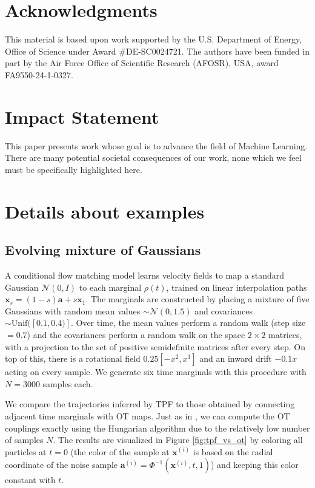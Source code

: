 \documentclass{article}
\newcommand{\bfx}{\boldsymbol{x}}
\newcommand{\bfa}{\boldsymbol{a}}
\theoremstyle{definition}
\theoremstyle{plain}
\theoremstyle{definition}
\theoremstyle{remark}
\newcommand{\Flow}{\Phi}
\begin{document}

\section*{Acknowledgments}
This material is based upon work supported by the U.S. Department of Energy, Office of Science under Award \#DE-SC0024721. The authors have been funded in part by the Air Force Office of Scientific Research (AFOSR), USA, award FA9550-24-1-0327.

\section*{Impact Statement}
This paper presents work whose goal is to advance the field of Machine Learning. There are many potential societal consequences of our work, none which we feel must be specifically highlighted here. 





\newpage
\appendix
\onecolumn
\section{Details about examples}






\subsection{Evolving mixture of Gaussians}\label{appendix:EvolvingGaussians}

A conditional flow matching model learns velocity fields to map a standard Gaussian $\mathcal{N}(0,I)$ to each marginal $\rho(t)$, trained on linear interpolation paths $\bfx_s = (1-s)\bfa + s\bfx_1$. The marginals are constructed by placing a mixture of five Gaussians with random mean values $\sim \mathcal{N}(0, 1.5)$ and covariances $\sim \mathrm{Unif}([0.1, 0.4)]$. Over time, the mean values perform a random walk (step size $= 0.7$) and the covariances perform a random walk on the space $2 \times 2$ matrices, with a projection to the set of positive semidefinite matrices after every step. On top of this, there is a rotational field $0.25 [-x^2, x^1]$ and an inward drift $-0.1 x$ acting on every sample. We generate six time marginals with this procedure with $N = 3000$ samples each.

We compare the trajectories inferred by TPF to those obtained by connecting adjacent time marginals with OT maps. Just as in \cite{terpin_2024_learning}, we can compute the OT couplings exactly using the Hungarian algorithm due to the relatively low number of samples $N$. The results are visualized in Figure \ref{fig:tpf_vs_ot} by coloring all particles at $t=0$ (the color of the sample at $\bfx^{(i)}$ is based on the radial coordinate of the noise sample $\bfa^{(i)} = \Flow^{-1}(\bfx^{(i)}, t, 1)$) and keeping this color constant with $t$.
\end{document}
